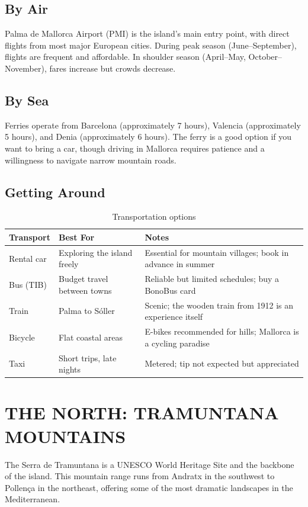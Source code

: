 \documentclass[
    language=english,
    doctype=travel-guide,
    institution=none,
]{../../omnilatex}
\begin{document}
\subsection{By Air}
Palma de Mallorca Airport (PMI) is the island's main entry point, with direct flights from most major European cities. During peak season (June--September), flights are frequent and affordable. In shoulder season (April--May, October--November), fares increase but crowds decrease.

\subsection{By Sea}
Ferries operate from Barcelona (approximately 7 hours), Valencia (approximately 5 hours), and Denia (approximately 6 hours). The ferry is a good option if you want to bring a car, though driving in Mallorca requires patience and a willingness to navigate narrow mountain roads.

\subsection{Getting Around}

\begin{table}[h]
\centering
\begin{tabular}{p{3cm}p{5cm}p{4cm}}
\toprule
\textbf{Transport} & \textbf{Best For} & \textbf{Notes} \\
\midrule
Rental car & Exploring the island freely & Essential for mountain villages; book in advance in summer \\
Bus (TIB) & Budget travel between towns & Reliable but limited schedules; buy a BonoBus card \\
Train & Palma to S\'{o}ller & Scenic; the wooden train from 1912 is an experience itself \\
Bicycle & Flat coastal areas & E-bikes recommended for hills; Mallorca is a cycling paradise \\
Taxi & Short trips, late nights & Metered; tip not expected but appreciated \\
\bottomrule
\end{tabular}
\caption{Transportation options}
\end{table}

\section*{THE NORTH: TRAMUNTANA MOUNTAINS}

The Serra de Tramuntana is a UNESCO World Heritage Site and the backbone of the island. This mountain range runs from Andratx in the southwest to Pollen\c{c}a in the northeast, offering some of the most dramatic landscapes in the Mediterranean.
\end{document}
